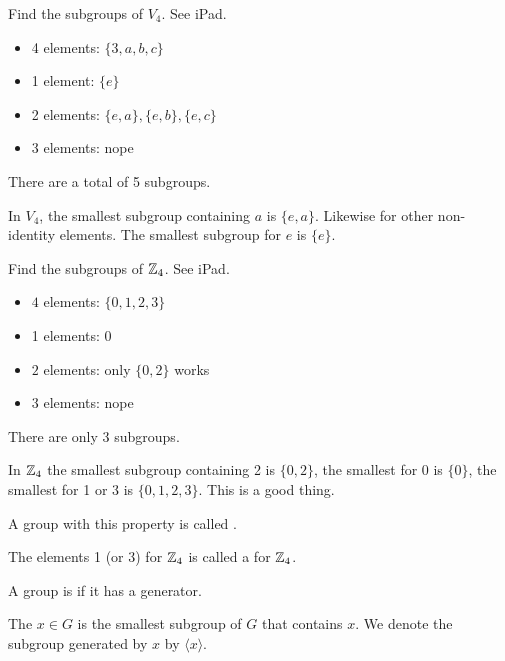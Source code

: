 \documentclass[class=article,crop=false]{standalone}
\begin{document}
\begin{eg}[]
Find the subgroups of $V_4$. See iPad.

\begin{itemize}
	\item 4 elements: $\{3,a,b,c\} $ 
	\item 1 element: $\{e\} $ 
	\item 2 elements: $\{e,a\},\{e,b\} ,\{e,c\}  $
	\item 3 elements: nope
\end{itemize}
There are a total of 5 subgroups.
\begin{note}[]
In $V_4$, the smallest subgroup containing  $a$ is $\{e,a\} $. Likewise for other non-identity elements. The smallest subgroup for  $e$ is  $\{e\} $.
\end{note}
\end{eg}

\begin{eg}[]
Find the subgroups of $\mathbb{Z}_4$. See iPad.
\begin{itemize}
	\item $4$ elements:  $\{0,1,2,3\} $ 
	\item 1 elements: $0$ 
\item  $2$ elements: only $\{0,2\} $ works
\item 3 elements: nope
\end{itemize}
There are only 3 subgroups.
\begin{note}[]
In $\mathbb{Z}_4$ the smallest subgroup containing 2 is $\{0,2\} $, the smallest for 0 is $\{0\} $, the smallest for 1 or 3 is  $\{0,1,2,3\} $. This is a good thing.
\end{note}
\end{eg}

A group with this property is called .

\begin{defn}[generator]
	The elements 1 (or 3) for $\mathbb{Z}_4$ is called a  for $\mathbb{Z}_4$. 
\end{defn}

\begin{defn}
	A group is  if it has a generator.
\end{defn}

\begin{defn}
The  $x \in G$ is the smallest subgroup of $G$ that contains $x$. We denote the subgroup generated by  $x$ by  $\langle x \rangle$. 
\end{defn}
\end{document}
